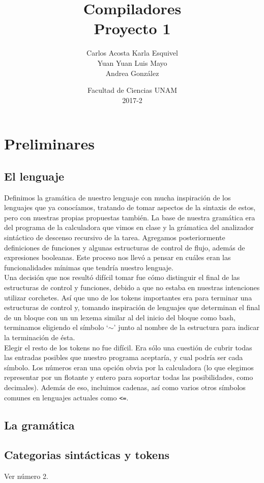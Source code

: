 \documentclass[12pt]{article}
\title{Compiladores\\ Proyecto 1}
\author{Carlos Acosta \qquad Karla Esquivel \\ Yuan Yuan \qquad Luis Mayo \\ Andrea González}
\date{Facultad de Ciencias UNAM \\ 2017-2}
\begin{document}
\maketitle
\tableofcontents
\newpage

\section{Preliminares}
\subsection{El lenguaje}
Definimos la gramática de nuestro lenguaje con mucha inspiración de los lenguajes que ya conocíamos, tratando de tomar aspectos de la sintaxis de estos, pero con nuestras propias propuestas también. La base de nuestra gramática era del programa de la calculadora que vimos en clase y la grámatica del analizador sintáctico de descenso recursivo de la tarea. Agregamos posteriormente definiciones de funciones y algunas estructuras de control de flujo, además de expresiones booleanas. Este proceso nos llevó a pensar en cuáles eran las funcionalidades mínimas que tendría nuestro lenguaje. \\

Una decisión que nos resultó difícil tomar fue cómo distinguir el final de las estructuras de control y funciones, debido a que no estaba en nuestras intenciones utilizar corchetes. Así que uno de los tokens importantes era para terminar una estructuras de control y, tomando inspiración de lenguajes que determinan el final de un bloque con un un lexema similar al del inicio del bloque como bash, terminamos eligiendo el símbolo `$\sim$'\; junto al nombre de la estructura para indicar la terminación de ésta. \\

Elegir el resto de los tokens no fue difícil. Era sólo una cuestión de cubrir todas las entradas posibles que nuestro programa aceptaría, y cual podría ser cada símbolo. Los números eran una opción obvia por la calculadora (lo que elegimos representar por un flotante y entero para soportar todas las posibilidades, como decimales). Además de eso, incluimos cadenas, así como varios otros símbolos comunes en lenguajes actuales como \texttt{<=}.

\subsection {La gramática}
\subsection{Categorias sintácticas y tokens}
Ver número 2.
\end{document}
